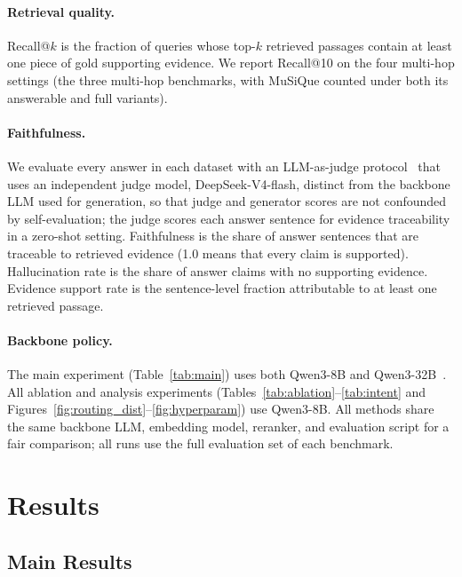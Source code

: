 \documentclass[11pt,a4paper]{article}
\begin{document}
\paragraph{Retrieval quality.}
Recall@$k$ is the fraction of queries whose top-$k$ retrieved passages contain at least one piece of gold supporting evidence.
We report Recall@10 on the four multi-hop settings (the three multi-hop benchmarks, with MuSiQue counted under both its answerable and full variants).

\paragraph{Faithfulness.}
We evaluate every answer in each dataset with an LLM-as-judge protocol~\citep{zheng2023judge} that uses an independent judge model, DeepSeek-V4-flash, distinct from the backbone LLM used for generation, so that judge and generator scores are not confounded by self-evaluation; the judge scores each answer sentence for evidence traceability in a zero-shot setting.
Faithfulness is the share of answer sentences that are traceable to retrieved evidence (1.0 means that every claim is supported).
Hallucination rate is the share of answer claims with no supporting evidence.
Evidence support rate is the sentence-level fraction attributable to at least one retrieved passage.

\paragraph{Backbone policy.}
The main experiment (Table~\ref{tab:main}) uses both Qwen3-8B and Qwen3-32B~\citep{qwen2025qwen3}.
All ablation and analysis experiments (Tables~\ref{tab:ablation}--\ref{tab:intent} and Figures~\ref{fig:routing_dist}--\ref{fig:hyperparam}) use Qwen3-8B.
All methods share the same backbone LLM, embedding model, reranker, and evaluation script for a fair comparison; all runs use the full evaluation set of each benchmark.

\section{Results}
\label{sec:results}

\subsection{Main Results}
\end{document}
